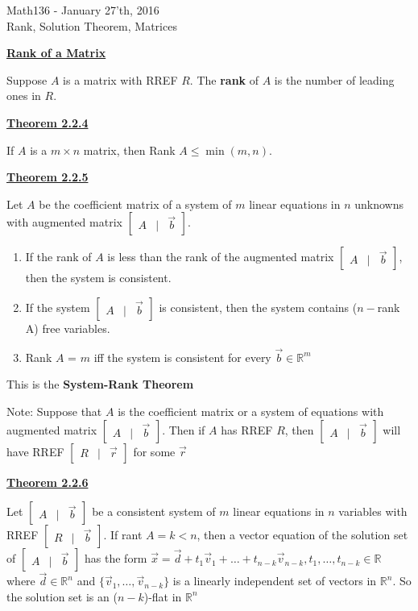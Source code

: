 \documentclass{letter}
\newcommand{\0}[1]{\begin{bmatrix}#1\end{bmatrix}}
\newcommand{\h}[1]{\underline{\textbf{#1}}}
\begin{document}
	\begin{center}
		\LARGE Math136 - January 27'th, 2016\\
		\large Rank, Solution Theorem, Matrices
	\end{center}
	\vspace{0.25 in}
	
	\h{Rank of a Matrix}
	
	Suppose $A$ is a matrix with RREF $R$. The \textbf{rank} of $A$ is the number of leading ones in $R$.
	
	\h{Theorem 2.2.4}
	
	If $A$ is a $m\times n$ matrix, then Rank $A \leq \min(m, n)$.
	
	\h{Theorem 2.2.5}
	
	Let $A$ be the coefficient matrix of a system of $m$ linear equations in $n$ unknowns with augmented matrix $\0{A&\vert&\vec b}$.
	
	\begin{enumerate}
		\item If the rank of $A$ is less than the rank of the augmented matrix $\0{A&\vert&\vec b}$, then the system is consistent.
		
		\item If the system $\0{A&\vert&\vec b}$ is consistent, then the system contains ($n - $rank A) free variables.
		
		\item Rank $A$ = $m$ iff the system is consistent for every $\vec b \in \mathbb{R}^m$
	\end{enumerate}
	
	This is the \textbf{System-Rank Theorem}
	
	Note: Suppose that $A$ is the coefficient matrix or a system of equations with augmented matrix $\0{A&\vert&\vec b}$. Then if $A$ has RREF $R$, then $\0{A&\vert&\vec b}$ will have RREF $\0{R&\vert&\vec r}$ for some $\vec r$
	
	\h{Theorem 2.2.6}
	
	Let $\0{A&\vert&\vec b}$ be a consistent system of $m$ linear equations in $n$ variables with RREF $\0{R&\vert&\vec b}$. If rant $A = k < n$, then a vector equation of the solution set of $\0{A&\vert&\vec b}$ has the form $\vec x = \vec d + t_1\vec v_1 + \dots + t_{n-k}\vec v_{n-k}, t_1, \dots, t_{n-k} \in \mathbb{R}$ where $\vec d \in \mathbb{R}^n$ and $\{ \vec v_1, \dots, \vec v_{n-k} \}$ is a linearly independent set of vectors in $\mathbb{R}^n$. So the solution set is an ($n-k$)-flat in $\mathbb{R}^n$
	
\end{document}
